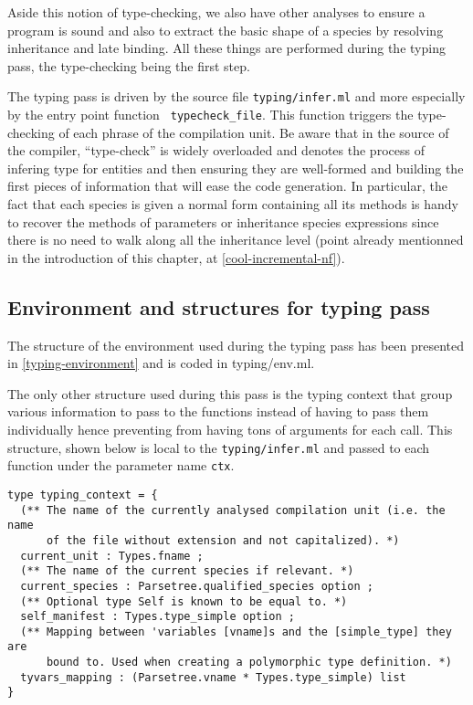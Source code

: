\medskip
Aside this notion of type-checking, we also have other analyses to
ensure a program is sound and also to extract the basic shape of a
species by resolving inheritance and late binding. All these things
are performed during the typing pass, the type-checking being the
first step.

\medskip
The typing pass is driven by the source file {\tt typing/infer.ml} and
more especially by the entry point function {\tt
  typecheck\_file}. This function triggers the type-checking of each
phrase of the compilation unit. Be aware that in the source of the
compiler, ``type-check'' is widely overloaded and denotes the process
of infering type for entities and then ensuring they are well-formed
and building the first pieces of information that will ease the code
generation. In particular, the fact that each species is given a
normal form containing all its methods is handy to recover the methods
of parameters or inheritance species expressions since there is no
need to walk along all the inheritance level (point already mentionned
in the introduction of this chapter, at \ref{cool-incremental-nf}).



\subsection{Environment and structures for typing pass}
The structure of the environment used during the typing pass has been
presented in \ref{typing-environment} and is coded in {typing/env.ml}.

The only other structure used during this pass is the typing context
that group various information to pass to the functions instead of
having to pass them individually hence preventing from having tons of
arguments for each call. This structure, shown below is local to
the {\tt typing/infer.ml} and passed to each function under the
parameter name {\tt ctx}.

{\footnotesize
\begin{lstlisting}[language=MyOCaml, title=Typing context]
type typing_context = {
  (** The name of the currently analysed compilation unit (i.e. the name
      of the file without extension and not capitalized). *)
  current_unit : Types.fname ;
  (** The name of the current species if relevant. *)
  current_species : Parsetree.qualified_species option ;
  (** Optional type Self is known to be equal to. *)
  self_manifest : Types.type_simple option ;
  (** Mapping between 'variables [vname]s and the [simple_type] they are
      bound to. Used when creating a polymorphic type definition. *)
  tyvars_mapping : (Parsetree.vname * Types.type_simple) list
}
\end{lstlisting}
}

